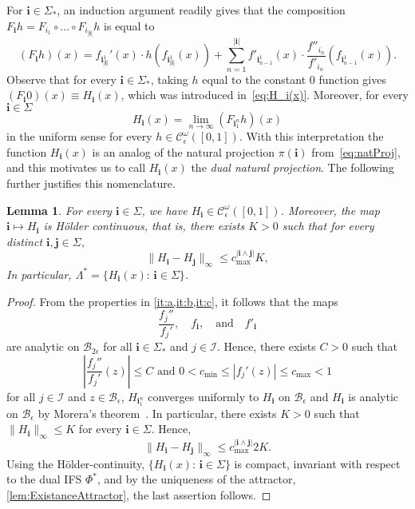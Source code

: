 \documentclass[11pt,]{article}
\def\cref#1{\ref{#1}}%
\newtheorem{lemma}[theorem]{Lemma}
\theoremstyle{definition}
\theoremstyle{remark}
\newcommand{\0}{\mathbf{0}}
\newcommand{\bi}{\mathbf{i}}
\newcommand{\bj}{\mathbf{j}}
\begin{document}
For $\bi\in\Sigma_*$, an induction argument readily gives that the composition
$F_{\bi}h=F_{i_1}\circ\ldots\circ F_{i_{|\bi|}}h$ is equal to
\begin{equation*}%
	(F_{\bi}h)(x) = f_{\bi_{|\bi|}^1}'(x)\cdot h(f_{\bi_{|\bi|}^1}(x)) + \sum_{n=1}^{|\bi|}
	f'_{\bi_{n-1}^1}(x) \cdot 
	\frac{f''_{i_n}}{f'_{i_n}}(f_{\bi_{n-1}^1}(x)).
\end{equation*}
Observe that for every $\bi\in\Sigma_*$, taking $h$ equal to the constant $0$ function gives
$(F_{\bi}0)(x)\equiv H_{\bi}(x)$, which was introduced
in~\cref{eq:H_i(x)}. Moreover, for every $\bi\in\Sigma$
\begin{equation*}%
	H_{\bi}(x)=\lim_{n\to\infty}(F_{\bi_1^n}h)(x)
\end{equation*}
in the uniform sense for every $h\in\mathcal{C}_\epsilon^\omega([0,1])$. With this interpretation
the function $H_{\bi}(x)$ is an analog of the natural projection $\pi(\bi)$ from~\cref{eq:natProj},
and this motivates us to call $H_{\bi}(x)$ the \emph{dual natural projection}. The following 
further justifies this nomenclature.
\begin{lemma}\label{thm:H_iAnalytic}
	For every $\bi\in\Sigma$, we have $H_{\bi}\in\mathcal{C}_\epsilon^{\omega}([0,1])$.
	Moreover, the map $\bi\mapsto H_{\bi}$ is H\"older continuous, that is, there exists $K>0$
	such that for every distinct $\bi,\bj\in\Sigma$,
	\begin{equation*}%
		\|H_{\bi}-H_{\bj}\|_\infty\leq c_{\max}^{|\bi\wedge\bj|}K,
	\end{equation*}
	In particular, $\Lambda^*=\{H_{\bi}(x):\, \bi\in\Sigma\}$.
\end{lemma}

\begin{proof}
 From the properties in \cref{it:a,it:b,it:c}, it follows that the maps
 \[
 \frac{f_j''}{f_j'},\quad f_{\bi}, \quad\text{and} \quad f'_{\bi}
 \]
 are analytic on $\mathcal{B}_{2\epsilon}$ for all $\bi\in\Sigma_*$ and $j\in\mathcal{I}$. Hence,
 there exists $C>0$ such that
	\[
	\left|\frac{f_j''}{f_j'}(z)\right| \leq C\text{ and }0<c_{\min}\leq|f_j'(z)|\leq c_{\max}<1
	\]
	for all $j\in\mathcal{I}$ and $z\in\mathcal{B}_{\epsilon}$, $H_{\bi_1^n}$ converges
	uniformly to $H_{\bi}$ on $\mathcal{B}_{\epsilon}$ and $H_{\bi}$ is analytic on
	$\mathcal{B}_{\epsilon}$ by Morera's theorem~\cite[Theorem 10.17]{Rudin_AnalysisBook}. In
	particular, there exists $K>0$ such that $\|H_{\bi}\|_\infty\leq K$ for every
	$\bi\in\Sigma$. Hence, $$
	\|H_{\bi}-H_{\bj}\|_\infty\leq c_{\max}^{|\bi\wedge\bj|}2K.
	$$
	Using the H\"older-continuity, $\{H_{\bi}(x):\, \bi\in\Sigma\}$ is compact, invariant with
	respect to the dual IFS $\Phi^*$, and by the uniqueness of the attractor,
	\cref{lem:ExistanceAttractor}, the last assertion follows.
\end{proof}
\end{document}
